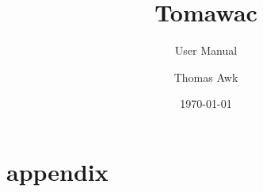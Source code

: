 \documentclass[Tomawac]{../../data/TelemacDoc} %
\begin{document}
\let\cleardoublepage\clearpage

\title{Tomawac}
\subtitle{User Manual}
\author{Thomas Awk}
\date{\today}
\maketitle
\clearpage



\newpage

\thispagestyle{empty}

\TelemacCopyright{}




\pagestyle{empty} %

\tableofcontents%


\pagestyle{fancy} %













\newpage 
\appendix
\chapter{appendix}





\end{document}
